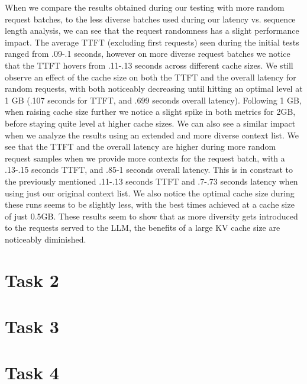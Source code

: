 \documentclass[a4paper, 11pt]{article}
\begin{document}
When we compare the results obtained during our testing with more random request batches, to the less diverse batches used during our latency vs. sequence length analysis, we can see that the request randomness has a slight performance impact. The average TTFT (excluding first requests) seen during the initial tests ranged from .09-.1 seconds, however on more diverse request batches we notice that the TTFT hovers from .11-.13 seconds across different cache sizes. We still observe an effect of the cache size on both the TTFT and the overall latency for random requests, with both noticeably decreasing until hitting an optimal level at 1 GB (.107 seconds for TTFT, and .699 seconds overall latency). Following 1 GB, when raising cache size further we notice a slight spike in both metrics for 2GB, before staying quite level at higher cache sizes. 
\newline\newline
We can also see a similar impact when we analyze the results using an extended and more diverse context list. We see that the TTFT and the overall latency are higher during more random request samples when we provide more contexts for the request batch, with a .13-.15 seconds TTFT, and .85-1 seconds overall latency. This is in constrast to the previously mentioned .11-.13 seconds TTFT and .7-.73 seconds latency when using just our original context list. We also notice the optimal cache size during these runs seems to be slightly less, with the best times achieved at a cache size of just 0.5GB. 
\newline\newline 
These results seem to show that as more diversity gets introduced to the requests served to the LLM, the benefits of a large KV cache size are noticeably diminished. 

\section{Task 2}

\section{Task 3}


\section{Task 4}
\end{document}

